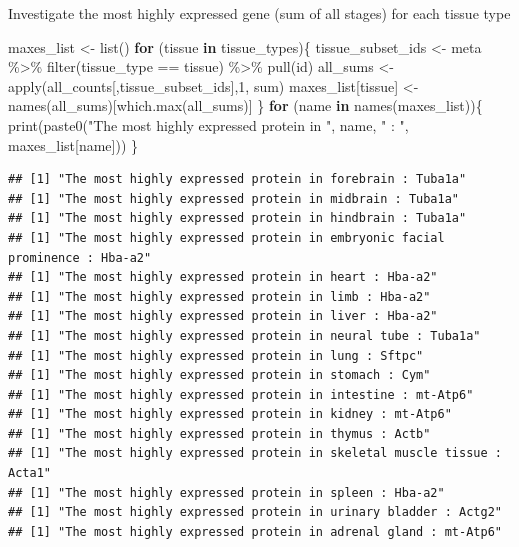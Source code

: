 \documentclass[
]{article}
\newenvironment{Shaded}{\begin{snugshade}}{\end{snugshade}}
\newcommand{\ControlFlowTok}[1]{\textcolor[rgb]{0.13,0.29,0.53}{\textbf{#1}}}
\newcommand{\DecValTok}[1]{\textcolor[rgb]{0.00,0.00,0.81}{#1}}
\newcommand{\FunctionTok}[1]{\textcolor[rgb]{0.00,0.00,0.00}{#1}}
\newcommand{\NormalTok}[1]{#1}
\newcommand{\OtherTok}[1]{\textcolor[rgb]{0.56,0.35,0.01}{#1}}
\newcommand{\SpecialCharTok}[1]{\textcolor[rgb]{0.00,0.00,0.00}{#1}}
\newcommand{\StringTok}[1]{\textcolor[rgb]{0.31,0.60,0.02}{#1}}
\begin{document}
Investigate the most highly expressed gene (sum of all stages) for each
tissue type

\begin{Shaded}
\begin{Highlighting}[]
\NormalTok{maxes\_list }\OtherTok{\textless{}{-}} \FunctionTok{list}\NormalTok{()}
\ControlFlowTok{for}\NormalTok{ (tissue }\ControlFlowTok{in}\NormalTok{ tissue\_types)\{}
\NormalTok{  tissue\_subset\_ids }\OtherTok{\textless{}{-}}\NormalTok{ meta }\SpecialCharTok{\%\textgreater{}\%} \FunctionTok{filter}\NormalTok{(tissue\_type }\SpecialCharTok{==}\NormalTok{ tissue) }\SpecialCharTok{\%\textgreater{}\%} \FunctionTok{pull}\NormalTok{(id)}
\NormalTok{  all\_sums }\OtherTok{\textless{}{-}} \FunctionTok{apply}\NormalTok{(all\_counts[,tissue\_subset\_ids],}\DecValTok{1}\NormalTok{, sum)}
\NormalTok{  maxes\_list[tissue] }\OtherTok{\textless{}{-}} \FunctionTok{names}\NormalTok{(all\_sums)[}\FunctionTok{which.max}\NormalTok{(all\_sums)]}
\NormalTok{\}}
\ControlFlowTok{for}\NormalTok{ (name }\ControlFlowTok{in} \FunctionTok{names}\NormalTok{(maxes\_list))\{}
  \FunctionTok{print}\NormalTok{(}\FunctionTok{paste0}\NormalTok{(}\StringTok{"The most highly expressed protein in "}\NormalTok{, name, }\StringTok{" : "}\NormalTok{, maxes\_list[name]))}
\NormalTok{\}}
\end{Highlighting}
\end{Shaded}

\begin{verbatim}
## [1] "The most highly expressed protein in forebrain : Tuba1a"
## [1] "The most highly expressed protein in midbrain : Tuba1a"
## [1] "The most highly expressed protein in hindbrain : Tuba1a"
## [1] "The most highly expressed protein in embryonic facial prominence : Hba-a2"
## [1] "The most highly expressed protein in heart : Hba-a2"
## [1] "The most highly expressed protein in limb : Hba-a2"
## [1] "The most highly expressed protein in liver : Hba-a2"
## [1] "The most highly expressed protein in neural tube : Tuba1a"
## [1] "The most highly expressed protein in lung : Sftpc"
## [1] "The most highly expressed protein in stomach : Cym"
## [1] "The most highly expressed protein in intestine : mt-Atp6"
## [1] "The most highly expressed protein in kidney : mt-Atp6"
## [1] "The most highly expressed protein in thymus : Actb"
## [1] "The most highly expressed protein in skeletal muscle tissue : Acta1"
## [1] "The most highly expressed protein in spleen : Hba-a2"
## [1] "The most highly expressed protein in urinary bladder : Actg2"
## [1] "The most highly expressed protein in adrenal gland : mt-Atp6"
\end{verbatim}
\end{document}
